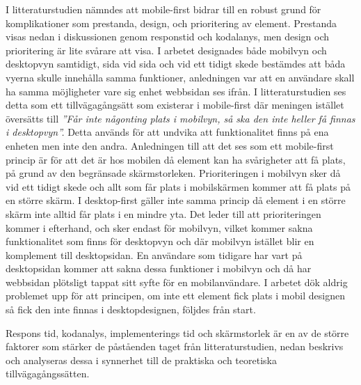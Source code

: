 \documentclass[11pt]{article}
\begin{document}
I litteraturstudien nämndes att mobile-first bidrar till en robust grund för komplikationer som prestanda, design, och prioritering av element. Prestanda visas nedan i diskussionen genom responstid och kodalanys, men design och prioritering är lite svårare att visa. I arbetet designades både mobilvyn och desktopvyn samtidigt, sida vid sida och vid ett tidigt skede bestämdes att båda vyerna skulle innehålla samma funktioner, anledningen var att en användare skall ha samma möjligheter vare sig enhet webbsidan ses ifrån. I litteraturstudien ses detta som ett tillvägagångsätt som existerar i mobile-first där meningen istället översätts till \textit{”Får inte någonting plats i mobilvyn, så ska den inte heller få finnas i desktopvyn”.} Detta används för att undvika att funktionalitet finns på ena enheten men inte den andra. Anledningen till att det ses som ett mobile-first princip är för att det är hos mobilen då element kan ha svårigheter att få plats, på grund av den begränsade skärmstorleken. Prioriteringen i mobilvyn sker då vid ett tidigt skede och allt som får plats i mobilskärmen kommer att få plats på en större skärm. I desktop-first gäller inte samma princip då element i en större skärm inte alltid får plats i en mindre yta. Det leder till att prioriteringen kommer i efterhand, och sker endast för mobilvyn, vilket kommer sakna funktionalitet som finns för desktopvyn och där mobilvyn istället blir en komplement till desktopsidan. En användare som tidigare har vart på desktopsidan kommer att sakna dessa funktioner i mobilvyn och då har webbsidan plötsligt tappat sitt syfte för en mobilanvändare. 
I arbetet dök aldrig problemet upp för att principen, om inte ett element fick plats i mobil designen så fick den inte finnas i desktopdesignen, följdes från start.

Respons tid, kodanalys, implementerings tid och skärmstorlek är en av de större faktorer som stärker de påståenden taget från litteraturstudien, nedan beskrivs och analyseras dessa i synnerhet till de praktiska och teoretiska tillvägagångssätten.
\end{document}
